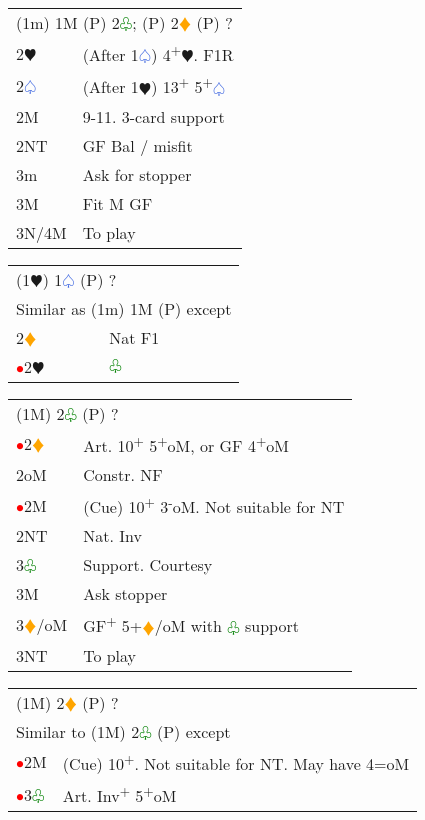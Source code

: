 \documentclass{article}
\renewcommand{\sp}{\textcolor{RoyalBlue}{$\varspade$}}
\newcommand{\he}{\textcolor{RubineRed}{$\varheart$}}
\newcommand{\di}{\textcolor{Orange}{$\vardiamond$}}
\newcommand{\cl}{\textcolor{Green}{$\varclub$}}
\newcommand{\nt}{\relsize{-1}NT\relsize{1}}
\newcommand{\up}{\textsuperscript{+}}
\newcommand{\down}{\textsuperscript{-}}
\newcommand{\al}{\textcolor{red}{$\bullet$}}
\begin{document}
\medskip

\begin{tabular}{|l|p{6.5cm}}
	\multicolumn{2}{l}{(1m) 1M (P) 2\cl{}; (P) 2\di{} (P) ? } \\
	2\he{} & (After 1\sp{}) 4\up{}\he{}. F1R \\
	2\sp{} & (After 1\he{}) 13\up{} 5\up{}\sp{} \\
	2M & 9-11. 3-card support \\
	2\nt{} & GF Bal / misfit \\
	3m & Ask for stopper \\
	3M & Fit M GF \\
	3N/4M & To play \\
\end{tabular}

\medskip

\begin{tabular}{|l|p{6.5cm}}
	\multicolumn{2}{l}{(1\he{}) 1\sp{} (P) ? } \\
	\multicolumn{2}{l}{Similar as (1m) 1M (P) except} \\
	2\di{} & Nat F1 \\
	\al{}2\he{} & \cl{} \\
\end{tabular}

\medskip

\begin{tabular}{|l|p{6.5cm}}
	\multicolumn{2}{l}{(1M) 2\cl{} (P) ? } \\
	\al{}2\di{} & Art. 10\up{} 5\up{}oM, or GF 4\up{}oM \\
	2oM & Constr. NF \\
	\al{}2M & (Cue) 10\up{} 3\down{}oM. Not suitable for \nt{} \\
	2\nt{} & Nat. Inv \\
	3\cl{} & Support. Courtesy \\
	3M & Ask stopper \\
	3\di{}/oM & GF\up{} 5+\di{}/oM with \cl{} support \\
	3\nt{} & To play
\end{tabular}

\medskip

\begin{tabular}{|l|p{6.5cm}}
	\multicolumn{2}{l}{(1M) 2\di{} (P) ? } \\
	\multicolumn{2}{l}{Similar to (1M) 2\cl{} (P) except} \\
	\al{}2M & (Cue) 10\up{}. Not suitable for \nt{}. May have 4=oM \\
	\al{}3\cl{} & Art. Inv\up{} 5\up{}oM \\
\end{tabular}
\end{document}
